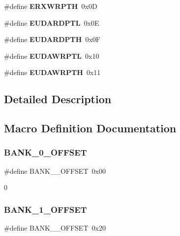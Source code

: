 \begin{DoxyCompactItemize}
\mbox{\label{group___special_ga9c9ff6952a5cb0c0b420bc6a405d726c}} 
\#define {\bfseries E\+R\+X\+W\+R\+P\+TH}~0x0D
\item 
\mbox{\label{group___special_ga06b17c501cd537fb4a777bc34817662a}} 
\#define {\bfseries E\+U\+D\+A\+R\+D\+P\+TL}~0x0E
\item 
\mbox{\label{group___special_gaf26365195bc63edeec44a77dff6a8bcb}} 
\#define {\bfseries E\+U\+D\+A\+R\+D\+P\+TH}~0x0F
\item 
\mbox{\label{group___special_gacf2456afd24006abb6177987c7d25a45}} 
\#define {\bfseries E\+U\+D\+A\+W\+R\+P\+TL}~0x10
\item 
\mbox{\label{group___special_ga3b68835e3131fd70a530d2dc785e85fd}} 
\#define {\bfseries E\+U\+D\+A\+W\+R\+P\+TH}~0x11
\end{DoxyCompactItemize}


\subsection{Detailed Description}


\subsection{Macro Definition Documentation}
\mbox{\label{group___special_ga66d34711bf1b18dddae4db092c250451}} 
\subsubsection{\texorpdfstring{BANK\_0\_OFFSET}{BANK\_0\_OFFSET}}
{\footnotesize\ttfamily \#define B\+A\+N\+K\+\_\+\_\+\+O\+F\+F\+S\+ET~0x00}

0 \mbox{\label{group___special_gae57b98d650d14147609e03fc9a65cd02}} 
\subsubsection{\texorpdfstring{BANK\_1\_OFFSET}{BANK\_1\_OFFSET}}
{\footnotesize\ttfamily \#define B\+A\+N\+K\+\_\+\_\+\+O\+F\+F\+S\+ET~0x20}

